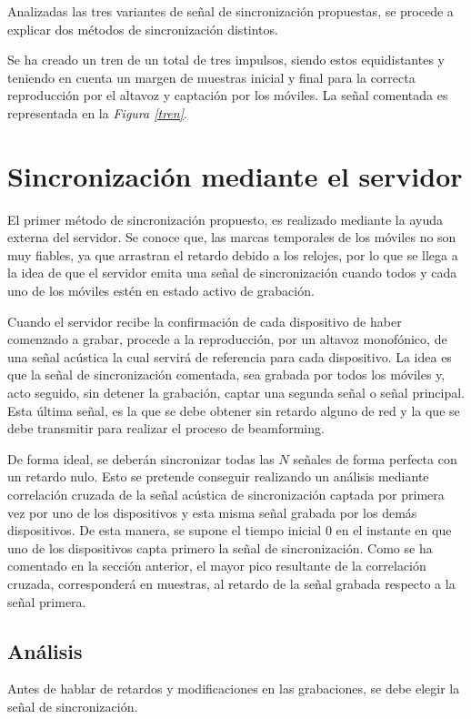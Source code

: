 \documentclass[a4paper,11pt]{book}
\begin{document}
Analizadas las tres variantes de señal de sincronización propuestas, se procede a explicar dos métodos de sincronización distintos.

Se ha creado un tren de un total de tres impulsos, siendo estos equidistantes y teniendo en cuenta un margen de muestras inicial y final para la correcta reproducción por el altavoz y captación por los móviles. La señal comentada es representada en la \textit{Figura \ref{tren}}.



\section{Sincronización mediante el servidor}

El primer método de sincronización propuesto, es realizado mediante la ayuda externa del servidor. Se conoce que, las marcas temporales de los móviles no son muy fiables, ya que arrastran el retardo debido a los relojes, por lo que se llega a la idea de que el servidor emita una señal de sincronización cuando todos y cada uno de los móviles estén en estado activo de grabación.

Cuando el servidor recibe la confirmación de cada dispositivo de haber comenzado a grabar, procede a la reproducción, por un altavoz monofónico, de una señal acústica la cual servirá de referencia para cada dispositivo. La idea es que la señal de sincronización comentada, sea grabada por todos los móviles y, acto seguido, sin detener la grabación, captar una segunda señal o señal principal. Esta última señal, es la que se debe obtener sin retardo alguno de red y la que se debe transmitir para realizar el proceso de beamforming.

De forma ideal, se deberán sincronizar todas las  $N$ señales de forma perfecta con un retardo nulo. Esto se pretende conseguir realizando un análisis mediante correlación cruzada de la señal acústica de sincronización captada por primera vez por uno de los dispositivos y esta misma señal grabada por los demás dispositivos. De esta manera, se supone el tiempo inicial 0 en el instante en que uno de los dispositivos capta primero la señal de sincronización. Como se ha comentado en la sección anterior, el mayor pico resultante de la correlación cruzada, corresponderá en muestras, al retardo de la señal grabada respecto a la señal primera.

\subsection{Análisis}
Antes de hablar de retardos y modificaciones en las grabaciones, se debe elegir la señal de sincronización.
\end{document}
